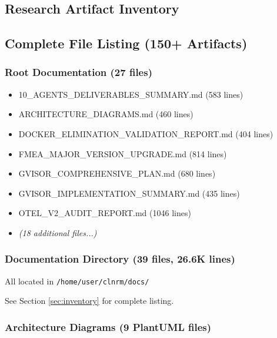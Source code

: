 \documentclass[12pt,twoside,openright]{book}
\theoremstyle{plain}
\theoremstyle{definition}
\theoremstyle{remark}
\begin{document}

\begin{appendices}

\chapter{Research Artifact Inventory}

\section{Complete File Listing (150+ Artifacts)}

\subsection{Root Documentation (27 files)}

\begin{itemize}
  \item 10\_AGENTS\_DELIVERABLES\_SUMMARY.md (583 lines)
  \item ARCHITECTURE\_DIAGRAMS.md (460 lines)
  \item DOCKER\_ELIMINATION\_VALIDATION\_REPORT.md (404 lines)
  \item FMEA\_MAJOR\_VERSION\_UPGRADE.md (814 lines)
  \item GVISOR\_COMPREHENSIVE\_PLAN.md (680 lines)
  \item GVISOR\_IMPLEMENTATION\_SUMMARY.md (435 lines)
  \item OTEL\_V2\_AUDIT\_REPORT.md (1046 lines)
  \item \textit{(18 additional files...)}
\end{itemize}

\subsection{Documentation Directory (39 files, 26.6K lines)}

All located in \texttt{/home/user/clnrm/docs/}

See Section \ref{sec:inventory} for complete listing.

\subsection{Architecture Diagrams (9 PlantUML files)}


\end{appendices}
\end{document}
